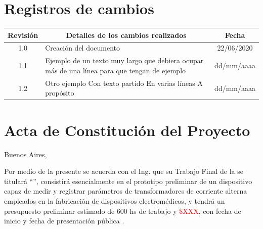 \documentclass[11pt]{charter}
\begin{document}
\maketitle
\thispagestyle{empty}
\pagebreak


\thispagestyle{empty}
{\setlength{\parskip}{0pt}
\tableofcontents{}
}
\pagebreak


\section{Registros de cambios}
\label{sec:registro}


\begin{table}[ht]
\label{tab:registro}
\centering

\begin{tabularx}{\linewidth}{@{}|c|X|c|@{}}
\hline
\rowcolor[HTML]{C0C0C0} 
Revisión & \multicolumn{1}{c|}{\cellcolor[HTML]{C0C0C0}Detalles de los cambios realizados} & Fecha      \\ \hline
1.0      & Creación del documento                                                          & 22/06/2020 \\ \hline
1.1      & Ejemplo de un texto muy largo que debiera ocupar más de una línea para que tengan de ejemplo                                                                                																						   & dd/mm/aaaa \\ \hline
1.2      & Otro ejemplo \newline
		   Con texto partido \newline
		   En varias líneas \newline
		   A propósito                                                                     & dd/mm/aaaa \\ \hline
\end{tabularx}
\end{table}

\pagebreak



\section{Acta de Constitución del Proyecto}
\label{sec:acta}

\begin{flushright}
Buenos Aires, \fechaInicioName
\end{flushright}

\vspace{2cm}

Por medio de la presente se acuerda con el Ing. \authorname\hspace{1px} que su Trabajo Final de la \degreename\hspace{1px} se titulará ``\ttitle'', consistirá esencialmente en el prototipo preliminar de un dispositivo capaz de medir y registrar parámetros de transformadores de corriente alterna empleados en la fabricación de dispositivos electromédicos, y tendrá un presupuesto preliminar estimado de 600 hs de trabajo y \textcolor{red}{\$XXX}, con fecha de inicio \fechaInicioName\hspace{1px} y fecha de presentación pública \fechaFinalName.
\end{document}
